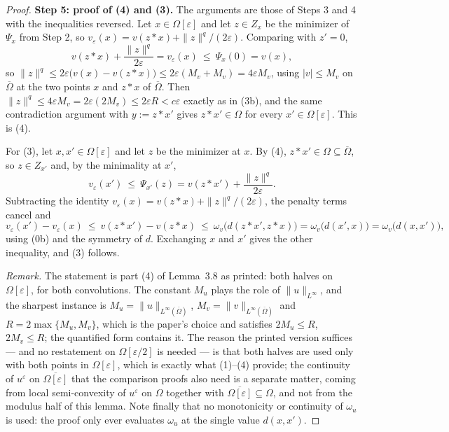 \begin{proof}
\medskip\noindent\textbf{Step 5: proof of (4) and (3).} The arguments are those of Steps 3
and 4 with the inequalities reversed. Let $x\in\Omega[\varepsilon]$ and let $z\in Z_x$ be
the minimizer of $\Psi_x$ from Step 2, so
$v_{\varepsilon}(x)=v(z*x)+\|z\|^{q}/(2\varepsilon)$. Comparing with $z'=0$,
\[
 v(z*x)+\frac{\|z\|^{q}}{2\varepsilon}=v_{\varepsilon}(x)\ \le\ \Psi_x(0)=v(x),
\]
so $\|z\|^{q}\le2\varepsilon\big(v(x)-v(z*x)\big)\le2\varepsilon(M_v+M_v)=4\varepsilon M_v$,
using $|v|\le M_v$ on $\overline\Omega$ at the two points $x$ and $z*x$ of
$\overline\Omega$. Then $\|z\|^{q}\le4\varepsilon M_v=2\varepsilon(2M_v)\le2\varepsilon R<c\varepsilon$
exactly as in (3b), and the same contradiction argument with $y:=z*x'$ gives
$z*x'\in\Omega$ for every $x'\in\Omega[\varepsilon]$. This is (4).

For (3), let $x,x'\in\Omega[\varepsilon]$ and let $z$ be the minimizer at $x$. By (4),
$z*x'\in\Omega\subseteq\overline\Omega$, so $z\in Z_{x'}$ and, by the minimality at $x'$,
\[
 v_{\varepsilon}(x')\ \le\ \Psi_{x'}(z)=v(z*x')+\frac{\|z\|^{q}}{2\varepsilon}.
\]
Subtracting the identity $v_{\varepsilon}(x)=v(z*x)+\|z\|^{q}/(2\varepsilon)$, the penalty
terms cancel and
\[
 v_{\varepsilon}(x')-v_{\varepsilon}(x)\ \le\ v(z*x')-v(z*x)
  \ \le\ \omega_v\big(d(z*x',z*x)\big)=\omega_v\big(d(x',x)\big)=\omega_v\big(d(x,x')\big),
\]
using (0b) and the symmetry of $d$. Exchanging $x$ and $x'$ gives the other inequality, and
(3) follows.

\medskip\noindent\emph{Remark.} The statement is part (4) of Lemma~3.8 as printed: both
halves on $\Omega[\varepsilon]$, for both convolutions. The constant $M_u$ plays the role of
$\|u\|_{L^{\infty}}$, and the sharpest instance is $M_u=\|u\|_{L^{\infty}(\overline\Omega)}$,
$M_v=\|v\|_{L^{\infty}(\overline\Omega)}$ and $R=2\max\{M_u,M_v\}$, which is the paper's
choice and satisfies $2M_u\le R$, $2M_v\le R$; the quantified form contains it. The reason
the printed version suffices --- and no restatement on $\Omega[\varepsilon/2]$ is needed ---
is that both halves are used only with both points in $\Omega[\varepsilon]$, which is exactly
what (1)--(4) provide; the continuity of $u^{\varepsilon}$ on $\overline{\Omega[\varepsilon]}$
that the comparison proofs also need is a separate matter, coming from local semi-convexity
of $u^{\varepsilon}$ on $\Omega$ together with
$\overline{\Omega[\varepsilon]}\subseteq\Omega$, and not from the modulus half of this
lemma. Note finally that no monotonicity or continuity of $\omega_u$ is used: the proof only
ever evaluates $\omega_u$ at the single value $d(x,x')$.
\end{proof}
